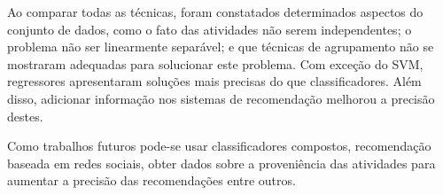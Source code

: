 \documentclass[10pt,letterpaper]{article}
\begin{document}
Ao comparar todas as técnicas, foram constatados determinados aspectos do conjunto de dados, como o fato das atividades não serem independentes; o problema não ser linearmente separável; e que técnicas de agrupamento não se mostraram adequadas para solucionar este problema. Com exceção do SVM, regressores apresentaram soluções mais precisas do que classificadores. Além disso, adicionar informação nos sistemas de recomendação melhorou a precisão destes. 

Como trabalhos futuros pode-se usar classificadores compostos, recomendação baseada em redes sociais, obter dados sobre a proveniência das atividades para aumentar a precisão das recomendações entre outros.







\end{document}
